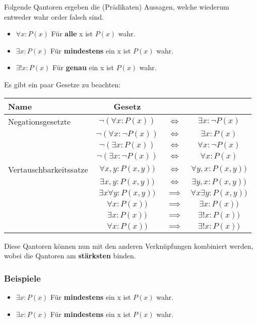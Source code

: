 \documentclass[a4paper,12pt]{article}
\begin{document}
Folgende Qantoren ergeben die (Prädikaten) Aussagen, welche wiederum entweder wahr order falsch sind.
\begin{itemize}
  \item $\forall x : P(x)$ Für \textbf{alle} x ist $P(x)$ wahr.
  \item $\exists x : P(x)$ Für \textbf{mindestens} ein x ist $P(x)$ wahr.
  \item $\exists! x : P(x)$ Für \textbf{genau} ein x ist $P(x)$ wahr.
\end{itemize}

Es gibt ein paar Gesetze zu beachten:

\begin{tabular}{l|ccc}
  \textbf{Name} & \textbf{Gesetz} \\
  \hline
  Negationsgesetzte & \(\neg ( \forall x : P(x)) \) & $\iff$ & $\exists x : \neg P(x) $\\
   & \(\neg ( \forall x : \neg P(x))\) & $ \iff $ & $\exists x :  P(x)$  \\
   & \(\neg ( \exists x :  P(x))\) & $\iff$ & \(\forall x : \neg P(x)\)  \\   
   & \(\neg ( \exists x : \neg P(x))\) & $ \iff $ & \(\forall x :  P(x)\)  \\
  \hline
  Vertauschbarkeitssatze & \( \forall x,y : P(x, y)) \) & $\iff$ & $\forall y,x : P(x, y)) $\\
   & \( \exists x,y : P(x, y)) \) & $\iff$ & $\exists y,x : P(x, y)) $\\
   & \( \exists x \forall y : P(x, y)) \) & $\implies$ & $\forall x \exists y : P(x, y))  $\\  
   \hline
   & \( \forall x  : P(x)) \) & $\implies$ & $\exists x : P(x))  $\\
   & \( \exists x : P(x)) \) & $\implies$ & $\exists! x : P(x))  $\\
   & \( \forall x : P(x)) \) & $\implies$ & $\exists! x : P(x))  $\\
  \end{tabular}

Diese Qantoren können nun mit den anderen Verknüpfungen kombiniert werden, wobei die Qantoren am \textbf{stärksten} binden.
\subsubsection{Beispiele}
\begin{itemize}
  \item $\exists x : P(x)$ Für \textbf{mindestens} ein x ist $P(x)$ wahr.
  \item $\exists x : P(x)$ Für \textbf{mindestens} ein x ist $P(x)$ wahr.
\end{itemize}
\end{document}
